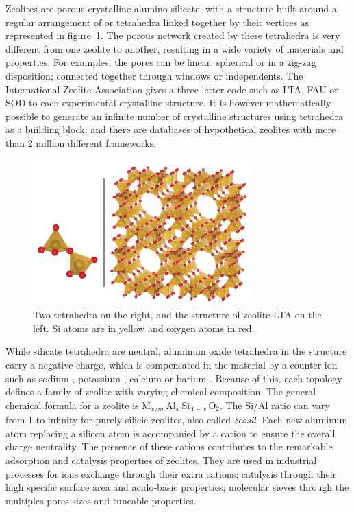 \documentclass[thesis]{subfiles}
\begin{document}
Zeolites are porous crystalline alumino-silicate, with a structure built around
a regular arrangement of  or  tetrahedra linked together by
their vertices as represented in figure~\ref{fig:zeolite-building-block}. The
porous network created by these tetrahedra is very different from one zeolite to
another, resulting in a wide variety of materials and properties. For examples,
the pores can be linear, spherical or in a zig-zag disposition; connected
together through windows or independents. The International Zeolite Association
gives a three letter code such as LTA, FAU or SOD to each experimental
crystalline structure. It is however mathematically possible to generate an
infinite number of crystalline structures using tetrahedra as a building block;
and there are databases of hypothetical zeolites with more than 2 million
different frameworks\cite{hypothetical-zeolites}.

\begin{figure}[ht]
    \centering
    \includegraphics[width=0.75\textwidth]{figures/cited/zeolite-building-blocks}
    \caption{Two  tetrahedra on the right, and the structure of zeolite
    LTA on the left. Si atoms are in yellow and oxygen atoms in red.}
    \label{fig:zeolite-building-block}
\end{figure}

While silicate tetrahedra  are neutral, aluminum oxide tetrahedra
 in the structure carry a negative charge, which is compensated in the
material by a counter ion such as sodium , potassium , calcium
 or barium . Because of this, each topology defines a
family of zeolite with varying chemical composition. The general chemical
formula for a zeolite is $\text{M}_{x/m}\, \text{Al}_x\, \text{Si}_{\,1-x}\,
\text{O}_2$. The Si/Al ratio can vary from 1 to infinity for purely silicic
zeolites, also called \emph{zeosil}. Each new aluminum atom replacing a silicon
atom is accompanied by a cation to ensure the overall charge neutrality. The
presence of these cations contributes to the remarkable adsorption and catalysis
properties of zeolites. They are used in industrial processes for ions exchange
through their extra cations; catalysis through their high specific surface area
and acido-basic properties; molecular sieves through the multiples pores sizes
and tuneable properties.
\end{document}
